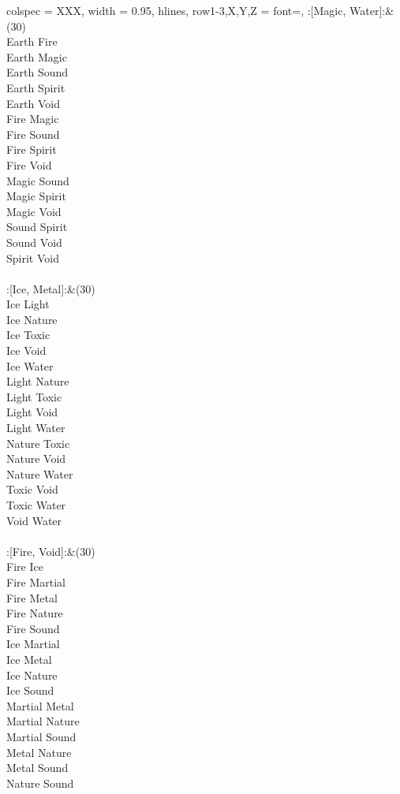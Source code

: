 \twocolumn
\begin{longtblr}[
	caption = {2v2 Defending Resisted},
	label = {2v2-Defending-Resisted},
]{
	colspec = {XXX}, width = 0.95\linewidth,
	hlines,
	row{1-3,X,Y,Z} = {font=\bfseries},
}
	:[Magic, Water]:&{(30)\\
	Earth Fire \\
	Earth Magic \\
	Earth Sound \\
	Earth Spirit \\
	Earth Void \\
	Fire Magic \\
	Fire Sound \\
	Fire Spirit \\
	Fire Void \\
	Magic Sound \\
	Magic Spirit \\
	Magic Void \\
	Sound Spirit \\
	Sound Void \\
	Spirit Void \\
	}\\

	:[Ice, Metal]:&{(30)\\
	Ice Light \\
	Ice Nature \\
	Ice Toxic \\
	Ice Void \\
	Ice Water \\
	Light Nature \\
	Light Toxic \\
	Light Void \\
	Light Water \\
	Nature Toxic \\
	Nature Void \\
	Nature Water \\
	Toxic Void \\
	Toxic Water \\
	Void Water \\
	}\\

	:[Fire, Void]:&{(30)\\
	Fire Ice \\
	Fire Martial \\
	Fire Metal \\
	Fire Nature \\
	Fire Sound \\
	Ice Martial \\
	Ice Metal \\
	Ice Nature \\
	Ice Sound \\
	Martial Metal \\
	Martial Nature \\
	Martial Sound \\
	Metal Nature \\
	Metal Sound \\
	Nature Sound \\
	}\\


\end{longtblr}
